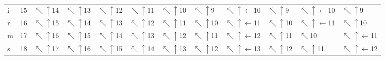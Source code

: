\begin{tabular}{llllllllllll}
i &  15 &  $\nwarrow\uparrow$14 &   $\nwarrow\uparrow$13 &   $\nwarrow\uparrow$12 &   $\nwarrow\uparrow$11 &   $\nwarrow\uparrow$10 &    $\nwarrow\uparrow$9 &  $\nwarrow\uparrow\leftarrow$10 &            $\nwarrow\uparrow$9 &  $\nwarrow\uparrow\leftarrow$10 &             $\nwarrow\uparrow$9 \\
r &  16 &  $\nwarrow\uparrow$15 &   $\nwarrow\uparrow$14 &   $\nwarrow\uparrow$13 &   $\nwarrow\uparrow$12 &   $\nwarrow\uparrow$11 &   $\nwarrow\uparrow$10 &  $\nwarrow\uparrow\leftarrow$11 &           $\nwarrow\uparrow$10 &  $\nwarrow\uparrow\leftarrow$11 &            $\nwarrow\uparrow$10 \\
m &  17 &  $\nwarrow\uparrow$16 &   $\nwarrow\uparrow$15 &   $\nwarrow\uparrow$14 &   $\nwarrow\uparrow$13 &   $\nwarrow\uparrow$12 &   $\nwarrow\uparrow$11 &  $\nwarrow\uparrow\leftarrow$12 &           $\nwarrow\uparrow$11 &                    $\nwarrow$10 &  $\nwarrow\uparrow\leftarrow$11 \\
s &  18 &  $\nwarrow\uparrow$17 &   $\nwarrow\uparrow$16 &   $\nwarrow\uparrow$15 &   $\nwarrow\uparrow$14 &   $\nwarrow\uparrow$13 &   $\nwarrow\uparrow$12 &  $\nwarrow\uparrow\leftarrow$13 &           $\nwarrow\uparrow$12 &            $\nwarrow\uparrow$11 &  $\nwarrow\uparrow\leftarrow$12 \\
\bottomrule
\end{tabular}
